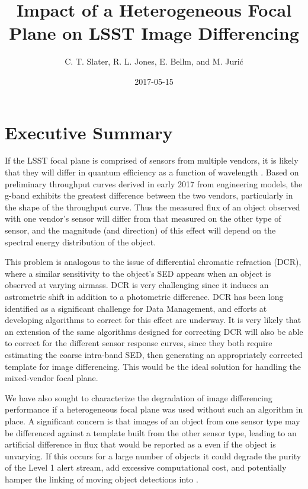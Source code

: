 \documentclass[DM,toc]{lsstdoc}
\title[Heterogeneous Focal Plane]{Impact of a Heterogeneous Focal Plane on LSST Image Differencing}
\author{C. T. Slater, R. L. Jones, E. Bellm, and M. Juri\'c}
\date{2017-05-15}
\begin{document}
\maketitle

\section{Executive Summary}

If the LSST focal plane is comprised of sensors from multiple vendors, it is
likely that they will differ in quantum efficiency as a function of wavelength .
Based on preliminary throughput curves derived in early 2017 from engineering
models, the g-band exhibits the greatest difference between the two vendors,
particularly in the shape of the throughput curve. Thus the measured flux of an
object observed with one vendor's sensor will differ from that measured on the
other type of sensor, and the magnitude (and direction) of this effect will
depend on the spectral energy distribution of the object.

This problem is analogous to the issue of differential chromatic refraction (DCR),
where a similar sensitivity to the object's SED appears when an object is
observed at varying airmass. DCR is very challenging since it induces an
astrometric shift in addition to a photometric difference. DCR has been long
identified as a significant challenge for Data Management, and efforts at
developing algorithms to correct for this effect are underway. It is very likely
that an extension of the same algorithms designed for correcting DCR will also
be able to correct for the different sensor response curves, since they both
require estimating the coarse intra-band SED, then generating an appropriately
corrected template for image differencing. This would be the ideal solution for
handling the mixed-vendor focal plane.

We have also sought to characterize the degradation of image differencing
performance if a heterogeneous focal plane was used without such an algorithm in place.
A significant concern is that images of an object from one sensor type may be
differenced against a template built from the other sensor type, leading to an
artificial difference in flux that would be reported as a \DIASource even if the
object is unvarying. If this occurs for a large number of objects it could
degrade the purity of the Level 1 alert stream, add excessive computational
cost, and potentially hamper the linking of moving object detections into
\SSObjects.
\end{document}
